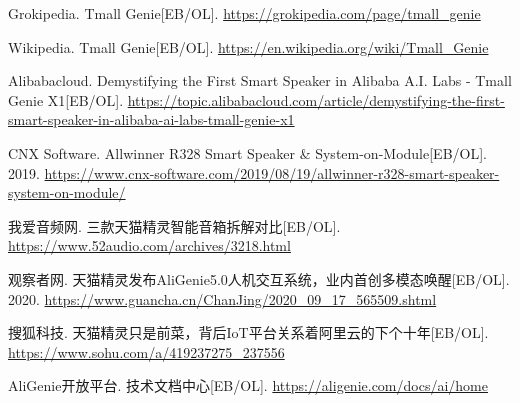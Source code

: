 \documentclass[12pt, a4paper, twoside, openright]{book}
\begin{document}
\begin{enumerate}[label={[\arabic*]}, leftmargin=3em]
\item Grokipedia. Tmall Genie[EB/OL]. \url{https://grokipedia.com/page/tmall_genie}

\item Wikipedia. Tmall Genie[EB/OL]. \url{https://en.wikipedia.org/wiki/Tmall_Genie}

\item Alibabacloud. Demystifying the First Smart Speaker in Alibaba A.I. Labs - Tmall Genie X1[EB/OL]. \url{https://topic.alibabacloud.com/article/demystifying-the-first-smart-speaker-in-alibaba-ai-labs-tmall-genie-x1}

\item CNX Software. Allwinner R328 Smart Speaker \& System-on-Module[EB/OL]. 2019. \url{https://www.cnx-software.com/2019/08/19/allwinner-r328-smart-speaker-system-on-module/}

\item 我爱音频网. 三款天猫精灵智能音箱拆解对比[EB/OL]. \url{https://www.52audio.com/archives/3218.html}

\item 观察者网. 天猫精灵发布AliGenie5.0人机交互系统，业内首创多模态唤醒[EB/OL]. 2020. \url{https://www.guancha.cn/ChanJing/2020_09_17_565509.shtml}

\item 搜狐科技. 天猫精灵只是前菜，背后IoT平台关系着阿里云的下个十年[EB/OL]. \url{https://www.sohu.com/a/419237275_237556}

\item AliGenie开放平台. 技术文档中心[EB/OL]. \url{https://aligenie.com/docs/ai/home}

\end{enumerate}
\end{document}
